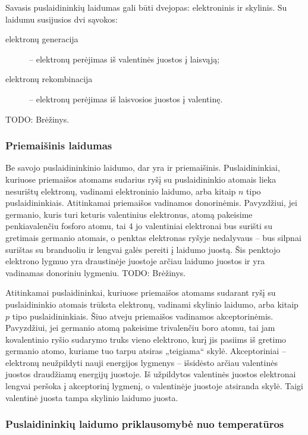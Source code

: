 Savasis puslaidininkių laidumas gali būti dvejopas: elektroninis ir
skylinis. Su laidumu susijusios dvi sąvokos:
\begin{description}
  \item[elektronų generacija] – elektronų perėjimas iš valentinės
    juostos į laisvąją;
  \item[elektronų rekombinacija] – elektronų perėjimas iš
    laisvosios juostos į valentinę.
\end{description}

TODO: Brėžinys.

\subsubsection{Priemaišinis laidumas}

Be savojo puslaidininkinio laidumo, dar yra ir priemaišinis.
Puslaidininkiai, kuriuose priemaišos atomams sudarius ryšį su
puslaidininkio atomais lieka nesurištų elektronų, vadinami
elektroninio laidumo, arba kitaip $n$ tipo puslaidininkiais.
Atitinkamai priemaišos vadinamos donorinėmis. Pavyzdžiui,
jei germanio, kuris turi keturis valentinius elektronus, atomą
pakeisime penkiavalenčiu fosforo atomu, tai 4 jo valentiniai
elektronai bus surišti su gretimais germanio atomais, o penktas
elektronas ryšyje nedalyvaus – bus silpnai surištas su branduoliu
ir lengvai galės pereiti į laidumo juostą. Šis penktojo elektrono
lygmuo yra draustinėje juostoje arčiau laidumo juostos ir yra
vadinamas donoriniu lygmeniu. TODO: Brėžinys.

Atitinkamai puslaidininkai, kuriuose priemaišos atomams sudarant
ryšį su puslaidininkio atomais trūksta elektronų, vadinami skylinio
laidumo, arba kitaip $p$ tipo puslaidininkiais. Šiuo atveju
priemaišos vadinamos akceptorinėmis. Pavyzdžiui, jei germanio
atomą pakeisime trivalenčiu boro atomu, tai jam kovalentinio
ryšio sudarymo truks vieno elektrono, kurį jis pasiims iš gretimo
germanio atomo, kuriame tuo tarpu atsiras „teigiama“ skylė.
Akceptoriniai – elektronų neužpildyti nauji energijos lygmenys –
išsidėsto arčiau valentinės juostos draudžiamų energijų juostoje.
Iš užpildytos valentinės juostos elektronai lengvai peršoka
į akceptorinį lygmenį, o valentinėje juostoje atsiranda skylė.
Taigi valentinė juosta tampa skylinio laidumo juosta.

\subsubsection{Puslaidininkių laidumo priklausomybė nuo temperatūros}

